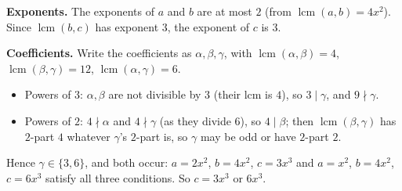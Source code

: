 \textbf{Exponents.} The exponents of $a$ and $b$ are at most $2$ (from $\operatorname{lcm}(a,b)=4x^2$). Since $\operatorname{lcm}(b,c)$ has exponent $3$, the exponent of $c$ is $3$.

\textbf{Coefficients.} Write the coefficients as $\alpha,\beta,\gamma$, with $\operatorname{lcm}(\alpha,\beta)=4$, $\operatorname{lcm}(\beta,\gamma)=12$, $\operatorname{lcm}(\alpha,\gamma)=6$.
\begin{itemize}
\item Powers of $3$: $\alpha,\beta$ are not divisible by $3$ (their lcm is $4$), so $3\mid\gamma$, and $9\nmid\gamma$.
\item Powers of $2$: $4\nmid\alpha$ and $4\nmid\gamma$ (as they divide $6$), so $4\mid\beta$; then $\operatorname{lcm}(\beta,\gamma)$ has $2$-part $4$ whatever $\gamma$'s $2$-part is, so $\gamma$ may be odd or have $2$-part $2$.
\end{itemize}
Hence $\gamma\in\{3,6\}$, and both occur: $a=2x^2$, $b=4x^2$, $c=3x^3$ and $a=x^2$, $b=4x^2$, $c=6x^3$ satisfy all three conditions. So $c=\boxed{3x^3\text{ or }6x^3}$.

